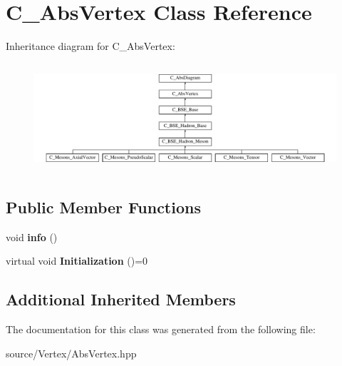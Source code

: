 \hypertarget{class_c___abs_vertex}{\section{C\-\_\-\-Abs\-Vertex Class Reference}
\label{class_c___abs_vertex}
}
Inheritance diagram for C\-\_\-\-Abs\-Vertex\-:\begin{figure}[H]
\begin{center}
\leavevmode
\includegraphics[height=4.048193cm]{class_c___abs_vertex}
\end{center}
\end{figure}
\subsection*{Public Member Functions}
\begin{DoxyCompactItemize}
\item 
\hypertarget{class_c___abs_vertex_a77761b8e56afe2536b821836ca372f63}{void {\bfseries info} ()}\label{class_c___abs_vertex_a77761b8e56afe2536b821836ca372f63}

\item 
\hypertarget{class_c___abs_vertex_af811c4349945a365f9a21caefd331ed3}{virtual void {\bfseries Initialization} ()=0}\label{class_c___abs_vertex_af811c4349945a365f9a21caefd331ed3}

\end{DoxyCompactItemize}
\subsection*{Additional Inherited Members}


The documentation for this class was generated from the following file\-:\begin{DoxyCompactItemize}
\item 
source/\-Vertex/Abs\-Vertex.\-hpp\end{DoxyCompactItemize}
